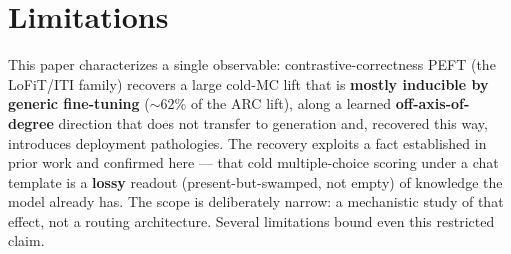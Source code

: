 \section{Limitations}\label{sec:limitations}

This paper characterizes a single observable: contrastive-correctness PEFT (the
LoFiT/ITI family) recovers a large cold-MC lift that is \textbf{mostly inducible by
generic fine-tuning} (${\sim}62\%$ of the ARC lift), along a learned
\textbf{off-axis-of-degree} direction that does not transfer to generation and,
recovered this way, introduces deployment pathologies. The recovery exploits a fact
established in prior work and confirmed here --- that cold multiple-choice scoring
under a chat template is a \textbf{lossy} readout (present-but-swamped, not empty)
of knowledge the model already has. The scope is deliberately narrow: a mechanistic
study of that effect, not a routing architecture. Several limitations bound even
this restricted claim.

